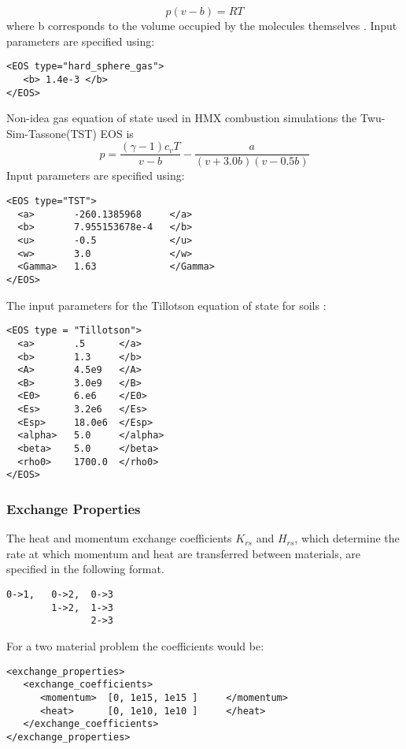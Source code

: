%
\begin{equation}
  p(v - b) = RT
\end{equation}
%
where b corresponds to the volume occupied by the molecules themselves \cite{ref:thompson}.
Input parameters are specified using:
%
\begin{Verbatim}[fontsize=\footnotesize]
<EOS type="hard_sphere_gas">
   <b> 1.4e-3 </b>
</EOS>
\end{Verbatim}
%
%
Non-idea gas equation of state used in HMX combustion simulations the Twu-Sim-Tassone(TST) EOS
is
\begin{equation}
  p = \frac{ (\gamma -1)c_v T }{ v - b} - \frac{ a }{(v+3.0b)(v-0.5b)}
\end{equation}
%
Input parameters are specified using:
%
\begin{Verbatim}[fontsize=\footnotesize]
<EOS type="TST">
  <a>       -260.1385968     </a>
  <b>       7.955153678e-4   </b>
  <u>       -0.5             </u>
  <w>       3.0              </w>
  <Gamma>   1.63             </Gamma>
</EOS>
\end{Verbatim}
%
%
The input parameters for the Tillotson equation of state \cite{ref:gathers} for soils :
%
\begin{Verbatim}[fontsize=\footnotesize]
<EOS type = "Tillotson">
  <a>       .5      </a>
  <b>       1.3     </b>
  <A>       4.5e9   </A>
  <B>       3.0e9   </B>
  <E0>      6.e6    </E0>
  <Es>      3.2e6   </Es>
  <Esp>     18.0e6  </Esp>
  <alpha>   5.0     </alpha>
  <beta>    5.0     </beta>
  <rho0>    1700.0  </rho0>
</EOS>
\end{Verbatim}
%
\subsubsection{Exchange Properties}
The heat and momentum exchange coefficients $K_{rs}$ and $H_{rs}$, which
determine the rate at which momentum and heat are transferred between
materials, are specified in the following format.
%
\begin{Verbatim}[fontsize=\footnotesize]
0->1,   0->2,  0->3
        1->2,  1->3
               2->3
\end{Verbatim}
%
For a two material problem the coefficients would be:
%
\begin{Verbatim}[fontsize=\footnotesize]
<exchange_properties> 
   <exchange_coefficients>
      <momentum>  [0, 1e15, 1e15 ]     </momentum>
      <heat>      [0, 1e10, 1e10 ]     </heat>  
   </exchange_coefficients>
</exchange_properties>
\end{Verbatim}
%
%
